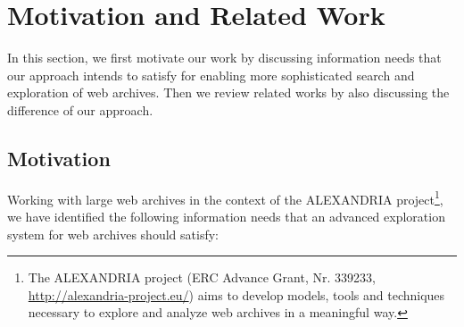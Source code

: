 \documentclass[twocolumn]{svjour3}
\begin{document}
\section{Motivation and Related Work}
\label{sec:motivAndRW}

In this section, we first
motivate our work by discussing information needs that our approach intends to
satisfy for enabling more sophisticated search and exploration of web archives.
Then we review related works by also discussing the difference of our approach.

\subsection{Motivation}
\label{motivation}

Working with large web archives in the context of the
ALEXANDRIA project\footnote{The ALEXANDRIA project (ERC Advance Grant, Nr. 339233, \url{http://alexandria-project.eu/})
aims to develop models, tools and techniques necessary to explore and analyze web archives in a meaningful way.},
we have identified the following information needs
that an advanced exploration system for web archives should satisfy:
\end{document}
